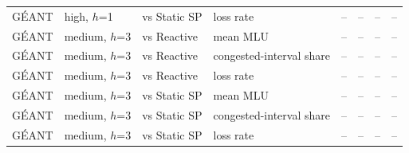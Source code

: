 \begin{table}[t]
\begin{tabular}{@{}llllcccc@{}}
G\'EANT & high, $h$=1 & vs Static SP & loss rate & -- & -- & -- & -- \\
G\'EANT & medium, $h$=3 & vs Reactive & mean MLU & -- & -- & -- & -- \\
G\'EANT & medium, $h$=3 & vs Reactive & congested-interval share & -- & -- & -- & -- \\
G\'EANT & medium, $h$=3 & vs Reactive & loss rate & -- & -- & -- & -- \\
G\'EANT & medium, $h$=3 & vs Static SP & mean MLU & -- & -- & -- & -- \\
G\'EANT & medium, $h$=3 & vs Static SP & congested-interval share & -- & -- & -- & -- \\
G\'EANT & medium, $h$=3 & vs Static SP & loss rate & -- & -- & -- & -- \\
\bottomrule
\end{tabular}
\end{table}
